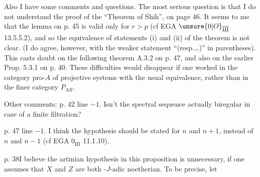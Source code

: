 Also I have some comments and questions. The most serious question is that I do not understand the proof of the ``Theorem of Shih'',  on page 46. It seems to me that the lemma on p. 45 is valid only for \(r>p\) (cf EGA \(\unsure{0|O}_{\overline{\underline{\mathrm{III}}}}\) 13.5.5.2), and so  the equivalence of statements (i) and (ii) of the theorem is not clear. (I do agree, however, with the weaker statement ``(resp.\ldots)'' in parentheses). This casts doubt on the following theorem A.3.2 on p. 47, and also on the earlier Prop. 5.3.1 on p. 40. These difficulties would disappear if one worked  in the category \(\mathrm{pro}\text{-}A\)  of projective systems with the usual equivalence, rather than in the  finer category \(P_{AR}\).

Other comments: p. 42 line \(\dot{-}1\). Isn't the spectral sequence actually biregular in case of a finite filtration?

p. 47 line \(-1\). I think the hypothesis should be stated for \(n\) and \(n+1\), instead of \(n\) and \(n-1\) (cf EGA \(0_{\overline{\underline{\mathrm{III}}}}\) 11.1.10).
\clearpage
{}

\noindent p. 38\quad I believe the artinian hypothesis in this proposition is unnecessary, if one assumes that \(X\) and \(Z\) are both -\(J\)-adic noetherian. To be precise, let

